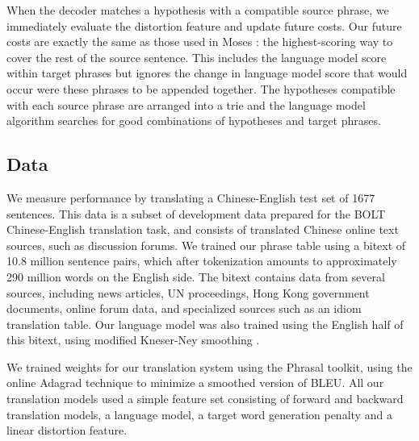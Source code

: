 \documentclass[11pt]{article}
\begin{document}
When the decoder matches a hypothesis with a compatible source phrase, we immediately evaluate the distortion feature and update future costs.  Our future costs are exactly the same as those used in Moses \cite{moses}: the highest-scoring way to cover the rest of the source sentence.  This includes the language model score within target phrases but ignores the change in language model score that would occur were these phrases to be appended together.  The hypotheses compatible with each source phrase are arranged into a trie and the language model algorithm searches for good combinations of hypotheses and target phrases.

\subsection{Data}

We measure performance by translating a Chinese-English test set of 1677 sentences. This data is a subset of development data prepared for the BOLT Chinese-English translation task, and consists of translated Chinese online text sources, such as discussion forums. We trained our phrase table using a bitext of 10.8 million sentence pairs, which after tokenization amounts to approximately 290 million words on the English side. The bitext contains data from several sources, including news articles, UN proceedings, Hong Kong government documents, online forum data, and specialized sources such as an idiom translation table. Our language model was also trained using the English half of this bitext, using modified Kneser-Ney smoothing \cite{}. 

We trained weights for our translation system using the Phrasal toolkit, using the online Adagrad technique to minimize a smoothed version of BLEU\cite{}. All our translation models used a simple feature set consisting of forward and backward translation models, a language model, a target word generation penalty and a linear distortion feature.  



\end{document}
